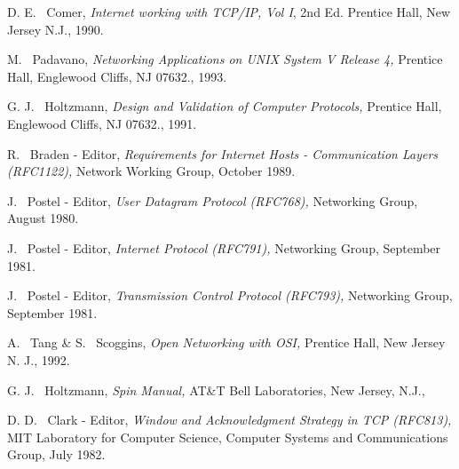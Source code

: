\begin{thebibliography}{NONAME}

\label{Com}D. E. ~Comer, {\it Internet working with TCP/IP, Vol I}, 2nd Ed. Prentice Hall, New Jersey N.J., 1990.

\label{Pado}M. ~Padavano, {\it Networking Applications on UNIX System V Release 4,} Prentice Hall, Englewood Cliffs, NJ 07632., 1993. 

\label{Holtz}G. J. ~Holtzmann, {\it Design and Validation of Computer Protocols,} Prentice Hall, Englewood Cliffs, NJ 07632., 1991.

\label{rfc1122}R. ~Braden - Editor, {\it Requirements for Internet Hosts - Communication Layers (RFC1122),} Network Working Group, October 1989.

\label{rfc768}J. ~Postel - Editor, {\it User Datagram Protocol (RFC768),} Networking Group, August 1980.

\label{rfc791}J. ~Postel - Editor, {\it Internet Protocol (RFC791),} Networking Group, September 1981.

\label{rfc793}J. ~Postel - Editor, {\it Transmission Control Protocol (RFC793),} Networking Group, September 1981.

\label{Tang}A. ~Tang \& S. ~Scoggins, {\it Open Networking with OSI,} Prentice Hall, New Jersey N. J., 1992.

\label{manu}G. J. ~Holtzmann, {\it Spin Manual,} AT\&T Bell Laboratories, New Jersey, N.J., 

\label{rfc813}D. D. ~Clark - Editor, {\it  Window and Acknowledgment Strategy in TCP (RFC813),} MIT Laboratory for Computer Science, Computer Systems and Communications Group, July 1982.

\end{thebibliography}


